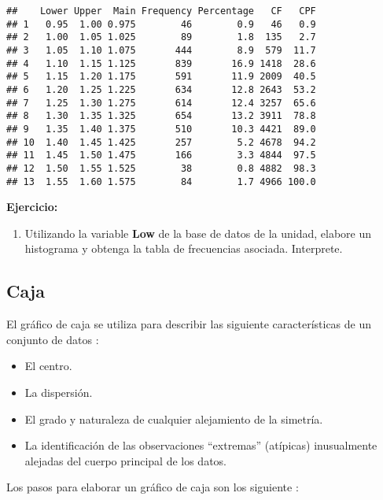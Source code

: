 \documentclass[
]{book}
\providecommand{\tightlist}{%
  \setlength{\itemsep}{0pt}\setlength{\parskip}{0pt}}
\begin{document}
\begin{verbatim}
##    Lower Upper  Main Frequency Percentage   CF   CPF
## 1   0.95  1.00 0.975        46        0.9   46   0.9
## 2   1.00  1.05 1.025        89        1.8  135   2.7
## 3   1.05  1.10 1.075       444        8.9  579  11.7
## 4   1.10  1.15 1.125       839       16.9 1418  28.6
## 5   1.15  1.20 1.175       591       11.9 2009  40.5
## 6   1.20  1.25 1.225       634       12.8 2643  53.2
## 7   1.25  1.30 1.275       614       12.4 3257  65.6
## 8   1.30  1.35 1.325       654       13.2 3911  78.8
## 9   1.35  1.40 1.375       510       10.3 4421  89.0
## 10  1.40  1.45 1.425       257        5.2 4678  94.2
## 11  1.45  1.50 1.475       166        3.3 4844  97.5
## 12  1.50  1.55 1.525        38        0.8 4882  98.3
## 13  1.55  1.60 1.575        84        1.7 4966 100.0
\end{verbatim}

\textbf{Ejercicio:}

\begin{enumerate}
\def\labelenumi{\arabic{enumi}.}
\tightlist
\item
  Utilizando la variable \textbf{Low} de la base de datos de la unidad, elabore un histograma y obtenga la tabla de frecuencias asociada. Interprete.
\end{enumerate}

\hypertarget{caja}{%
\subsection{Caja}\label{caja}}

El gráfico de caja se utiliza para describir las siguiente características de un conjunto de datos \citep[página 35]{Devore}:

\begin{itemize}
\tightlist
\item
  El centro.
\item
  La dispersión.
\item
  El grado y naturaleza de cualquier alejamiento de la simetría.
\item
  La identificación de las observaciones ``extremas'' (atípicas) inusualmente alejadas del cuerpo principal de los datos.
\end{itemize}

Los pasos para elaborar un gráfico de caja son los siguiente \citep[página 106]{anderson}:
\end{document}
